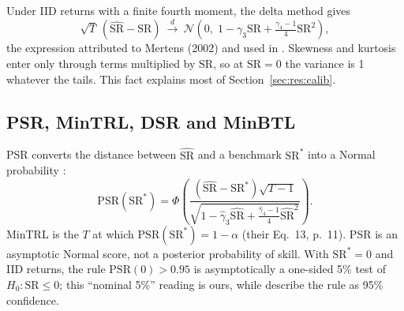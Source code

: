 \documentclass[11pt,a4paper]{article}
\newcommand{\SR}{\mathrm{SR}}
\newcommand{\hSR}{\widehat{\mathrm{SR}}}
\begin{document}
Under IID returns with a finite fourth moment, the delta method gives
\begin{equation}\label{eq:mertens}
\sqrt{T}\,(\hSR-\SR)\ \xrightarrow{d}\ \mathcal N\!\left(0,\;1-\gamma_3\SR+\tfrac{\gamma_4-1}{4}\SR^2\right),
\end{equation}
the expression attributed to Mertens (2002) and used in \citet[Eq.~8, p.~8]{bailey2012frontier}. Skewness and kurtosis enter only through terms multiplied by $\SR$, so at $\SR=0$ the variance is 1 whatever the tails. This fact explains most of Section~\ref{sec:res:calib}.

\subsection{PSR, MinTRL, DSR and MinBTL}
PSR converts the distance between $\hSR$ and a benchmark $\SR^\ast$ into a Normal probability \citep[Eq.~11, p.~9]{bailey2012frontier}:
\begin{equation}\label{eq:psr}
\mathrm{PSR}(\SR^\ast)=\Phi\!\left(\frac{(\hSR-\SR^\ast)\sqrt{T-1}}{\sqrt{1-\hat\gamma_3\hSR+\frac{\hat\gamma_4-1}{4}\hSR^2}}\right).
\end{equation}
MinTRL is the $T$ at which $\mathrm{PSR}(\SR^\ast)=1-\alpha$ (their Eq.~13, p.~11). PSR is an asymptotic Normal score, not a posterior probability of skill. With $\SR^\ast=0$ and IID returns, the rule $\mathrm{PSR}(0)>0.95$ is asymptotically a one-sided 5\% test of $H_0:\SR\le0$; this ``nominal 5\%'' reading is ours, while \citet[p.~12]{bailey2012frontier} describe the rule as 95\% confidence.
\end{document}
